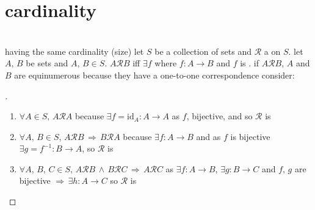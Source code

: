\documentclass{article}
\newcommand{\spaced}[1]{\, #1 \,}
\newcommand{\sland}{\spaced{\land}}
\newcommand{\simplies}{\spaced{\Rightarrow}}
\newcommand{\slexists}{\, \exists}
\begin{document}
    \newpage
    \color{Black}
    \section{cardinality}
    
        \begin{definition}[equinumerous]\label{equinumerous}
            \hspace{0em}\vspace{-1em}\\
            \tab\tab having the same cardinality (size)\newline
            \vspace{1em}
            \tab let $S$ be a collection of sets and $\mathcal{R}$ a  on $S$.\newline
            \vspace{1em}
            \tab let $A,\, B$ be sets and $A,\, B \in S$. $A\mathcal{R}B$ iff $\exists f$ where $f: A \rightarrow B$ and $f$ is . if $A\mathcal{R}B$, $A$ and $B$ are \newline
            \tab\tab equinumerous because they have a one-to-one correspondence\newline
            \vspace{1em}
            \tab consider:
            
            \begin{proof}[\unskip\nopunct]
                \begin{enumerate}[label={\arabic*)}, partopsep=1em, itemsep=0.25em, left=6em]
                
                    \item $\forall A \in S, \, A\mathcal{R}A$ because $\exists f = \text{id}_{A}: A \rightarrow A$ as $f$, bijective, and so $\mathcal{R}$ is 
                    
                    \item $\forall A, \, B \in S$, $A\mathcal{R}B \simplies B\mathcal{R}A$ because $\exists f: A \rightarrow B$ and as $f$ is bijective $\exists g = f^{-1}: B \rightarrow A$, so $\mathcal{R}$ is 
                    \item $\forall A, \, B, \, C \in S, \, A\mathcal{R}B \sland B\mathcal{R}C \simplies A\mathcal{R}C$ as $\exists f: A \rightarrow B,\slexists g: B \rightarrow C$ and $f,\, g$ are bijective $\Rightarrow \slexists h: A \rightarrow C$ so $\mathcal{R}$ is  


\end{enumerate}
\end{proof}
\end{definition}
\end{document}

